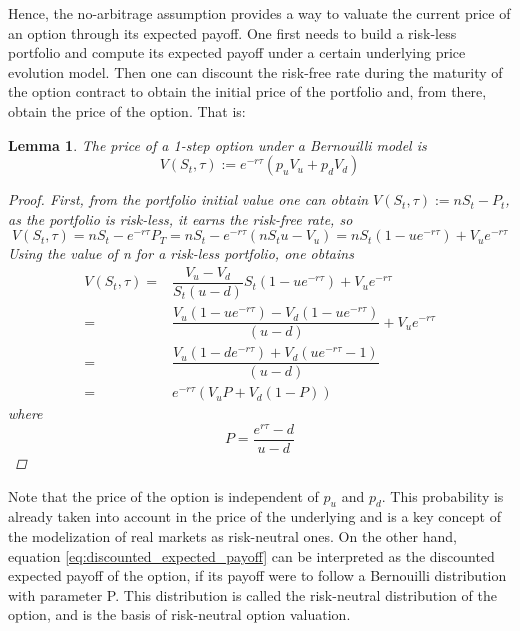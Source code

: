 \documentclass[12,twoside]{mammeTFM}
\newtheorem{lem}[thm]{Lemma}
\theoremstyle{definition}
\theoremstyle{remark}
\begin{document}
Hence, the no-arbitrage assumption provides a way to valuate the current price of an option through its expected payoff. One first needs to build a risk-less portfolio and compute its expected payoff under a certain underlying price evolution model. Then one can discount the risk-free rate during the maturity of the option contract to obtain the initial price of the portfolio and, from there, obtain the price of the option. That is:
\begin{lem} The price of a 1-step option under a Bernouilli model is
\begin{equation}
V(S_t, \tau) := e^{-r\tau} \left( p_u V_u + p_d V_d \right)
\end{equation}
\begin{proof}
First, from the portfolio initial value one can obtain $V(S_t, \tau) := n S_t - P_t$, as the portfolio is risk-less,  it earns the risk-free rate, so 
\begin{equation}
V(S_t, \tau) = n S_t - e^{-r\tau} P_T = n S_t - e^{-r\tau}\left(n S_t u - V_u \right) = nS_t(1 - u e^{-r\tau}) + V_u e^{-r\tau}
\end{equation}
Using the value of n for a risk-less portfolio, one obtains
\begin{align}
V(S_t, \tau) =& \dfrac{V_u - V_d}{S_t(u - d)} S_t(1 - u e^{-r\tau}) + V_u e^{-r\tau} \\
 =& \dfrac{V_u (1 - u e^{-r\tau}) - V_d (1 - u e^{-r\tau})}{(u - d)} + V_u e^{-r\tau} \\
 =& \dfrac{V_u (1 - d e^{-r\tau}) + V_d (u e^{-r\tau} - 1)}{(u - d)} \\
 \label{eq:discounted_expected_payoff}
 =& e^{-r\tau} \left( V_u P + V_d (1 - P) \right)
\end{align}
where
\begin{equation}
P = \dfrac{e^{r\tau} - d}{u - d}
\end{equation}
\end{proof}
\end{lem}

Note that the price of the option is independent of $p_u$ and $p_d$. This probability is already taken into account in the price of the underlying and is a key concept of the modelization of real markets as risk-neutral ones. On the other hand, equation \ref{eq:discounted_expected_payoff} can be interpreted as the discounted expected payoff of the option, if its payoff were to follow a Bernouilli distribution with parameter P. This distribution is called the risk-neutral distribution of the option, and is the basis of risk-neutral option valuation.
\end{document}
